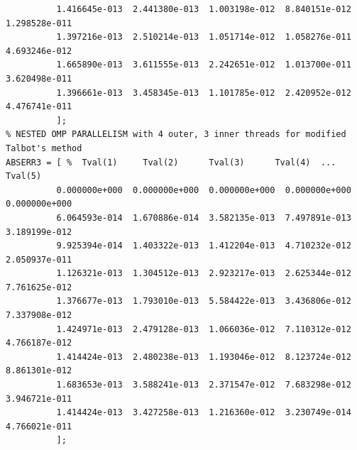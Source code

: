 \documentclass[a4paper,10pt]{report}%
\begin{document}
\begin{lstlisting}
          1.416645e-013  2.441380e-013  1.003198e-012  8.840151e-012  1.298528e-011
          1.397216e-013  2.510214e-013  1.051714e-012  1.058276e-011  4.693246e-012
          1.665890e-013  3.611555e-013  2.242651e-012  1.013700e-011  3.620498e-011
          1.396661e-013  3.458345e-013  1.101785e-012  2.420952e-012  4.476741e-011
          ];
% NESTED OMP PARALLELISM with 4 outer, 3 inner threads for modified Talbot's method
ABSERR3 = [ %  Tval(1)     Tval(2)      Tval(3)      Tval(4)  ... Tval(5)
          0.000000e+000  0.000000e+000  0.000000e+000  0.000000e+000  0.000000e+000
          6.064593e-014  1.670886e-014  3.582135e-013  7.497891e-013  3.189199e-012
          9.925394e-014  1.403322e-013  1.412204e-013  4.710232e-012  2.050937e-011
          1.126321e-013  1.304512e-013  2.923217e-013  2.625344e-012  7.761625e-012
          1.376677e-013  1.793010e-013  5.584422e-013  3.436806e-012  7.337908e-012
          1.424971e-013  2.479128e-013  1.066036e-012  7.110312e-012  4.766187e-012
          1.414424e-013  2.480238e-013  1.193046e-012  8.123724e-012  8.861301e-012
          1.683653e-013  3.588241e-013  2.371547e-012  7.683298e-012  3.946721e-011
          1.414424e-013  3.427258e-013  1.216360e-012  3.230749e-014  4.766021e-011
          ];
\end{lstlisting}
\end{document}

